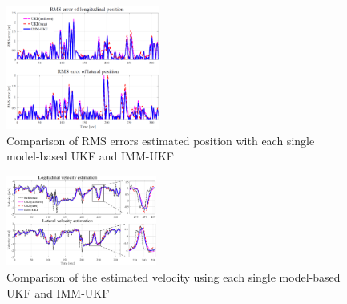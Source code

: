 \documentclass[journal]{IEEEtran}
\begin{document}
     \begin{figure}
		\centering
		\includegraphics[width=0.45\textwidth]{figures/Estimated_RMS_position_error2}
		\caption{Comparison of RMS errors estimated position with each single model-based UKF and IMM-UKF}
		\label{fig:track_pos}
	\end{figure}
 	\begin{figure}
		\centering
		\includegraphics[width=0.44\textwidth]{figures/Compare_velocity_est5}
		\caption{Comparison of the estimated velocity using each single model-based UKF and IMM-UKF}
		\label{fig:track_v}
	\end{figure}   
\end{document}
